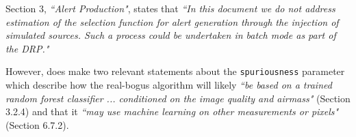 Section 3, {\it ``Alert Production"}, states that {\it ``In this document we do not address estimation of the selection function for alert generation through the injection of simulated sources. Such a process could be undertaken in batch mode as part of the DRP."}

However,  does make two relevant statements about the {\tt spuriousness} parameter which describe how the real-bogus algorithm will likely {\it ``be based on a trained random forest classifier ... conditioned on the image quality and airmass"} (Section 3.2.4) and that it  {\it ``may use machine learning on other measurements or pixels"} (Section 6.7.2).





